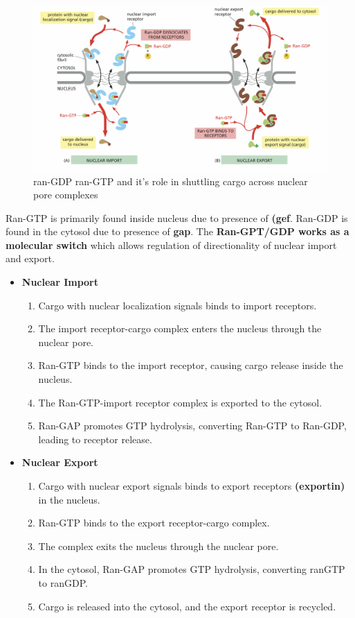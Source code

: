 \documentclass[../main.tex]{subfiles}
\begin{document}
\begin{figure}[H]
    \centering
    \includegraphics[width=\linewidth]{Sum_Cell_Bio_II//lectures//cbII4/RanGDP.png}
    \caption{ran-GDP ran-GTP and it's role in shuttling cargo across nuclear pore complexes}
    \label{fig:enter-label}
\end{figure}

Ran-GTP is primarily found inside nucleus due to presence of \textbf{(\gls{gef}}. Ran-GDP is found in the cytosol due to presence of \textbf{\gls{gap}}. The \textbf{Ran-GPT/GDP works as a molecular switch} which allows regulation of directionality of nuclear import and export.
\begin{itemize}
    \item \textbf{Nuclear Import}
    \begin{enumerate}
        \item Cargo with nuclear localization signals binds to import receptors.
        \item The import receptor-cargo complex enters the nucleus through the nuclear pore.
        \item Ran-GTP binds to the import receptor, causing cargo release inside the nucleus.
        \item The Ran-GTP-import receptor complex is exported to the cytosol.
        \item Ran-GAP promotes GTP hydrolysis, converting Ran-GTP to Ran-GDP, leading to receptor release.
    \end{enumerate}
    
    \item \textbf{Nuclear Export}
    \begin{enumerate}
   
        \item Cargo with nuclear export signals binds to export receptors \textbf{(\gls{exportin})} in the nucleus.
        \item Ran-GTP binds to the export receptor-cargo complex.
        \item The complex exits the nucleus through the nuclear pore.
        \item In the cytosol, Ran-GAP promotes GTP hydrolysis, converting \gls{ranGTP} to \gls{ranGDP}.
        \item Cargo is released into the cytosol, and the export receptor is recycled.
    \end{enumerate}
\end{itemize}
\end{document}
